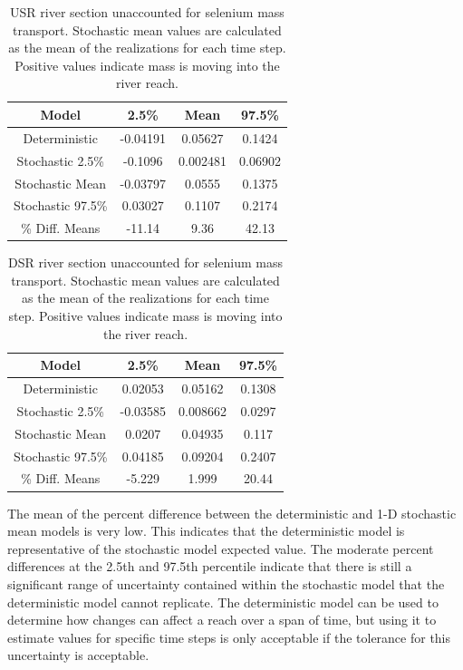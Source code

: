 \begin{linenumbers}
\begin{table}[htbp]
\centering
\caption[USR river section unaccounted for selenium mass transport.]{USR river section unaccounted for selenium mass transport.  Stochastic mean values are calculated as the mean of the realizations for each time step.  Positive values indicate mass is moving into the river reach.}
\label{tab:USRSe}
\begin{tabular}{c|ccc}
	\toprule
	Model& 2.5\% & Mean & 97.5\% \\
	\midrule
	\midrule
	Deterministic&		-0.04191&	0.05627&	0.1424\\
	\midrule			                               
	Stochastic 2.5\%&	-0.1096&	0.002481&	0.06902\\
	Stochastic Mean&	-0.03797&	0.0555&	0.1375\\     
	Stochastic 97.5\%&	0.03027&	0.1107&	0.2174\\     
	\midrule                                           
	\% Diff. Means &	-11.14&	9.36&	42.13\\
	\bottomrule
\end{tabular}
\end{table}

\begin{table}[htbp]
\centering
\caption[DSR river section unaccounted for selenium mass transport.]{DSR river section unaccounted for selenium mass transport.  Stochastic mean values are calculated as the mean of the realizations for each time step.  Positive values indicate mass is moving into the river reach.}
\label{tab:DSRSe}
\begin{tabular}{c|ccc}
	\toprule
	Model& 2.5\% & Mean & 97.5\% \\
	\midrule
	\midrule
	Deterministic&		0.02053&	0.05162&	0.1308\\
	\midrule			                                
	Stochastic 2.5\%&	-0.03585&	0.008662&	0.0297\\
	Stochastic Mean&	0.0207&	0.04935&	0.117\\     
	Stochastic 97.5\%&	0.04185&	0.09204&	0.2407\\
	\midrule                                            
	\% Diff. Means &	-5.229&	1.999&	20.44\\
	\bottomrule
\end{tabular}
\end{table}

The mean of the percent difference between the deterministic and 1-D stochastic mean models is very low.  This indicates that the deterministic model is representative of the stochastic model expected value.  The moderate percent differences at the 2.5th and 97.5th percentile indicate that there is still a significant range of uncertainty contained within the stochastic model that the deterministic model cannot replicate.  The deterministic model can be used to determine how changes can affect a reach over a span of time, but using it to estimate values for specific time steps is only acceptable if the tolerance for this uncertainty is acceptable.


\end{linenumbers}
